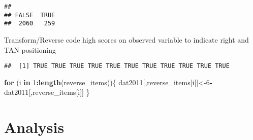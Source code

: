 \documentclass[
]{article}
\newenvironment{Shaded}{\begin{snugshade}}{\end{snugshade}}
\newcommand{\ControlFlowTok}[1]{\textcolor[rgb]{0.13,0.29,0.53}{\textbf{#1}}}
\newcommand{\DecValTok}[1]{\textcolor[rgb]{0.00,0.00,0.81}{#1}}
\newcommand{\KeywordTok}[1]{\textcolor[rgb]{0.13,0.29,0.53}{\textbf{#1}}}
\newcommand{\NormalTok}[1]{#1}
\newcommand{\OperatorTok}[1]{\textcolor[rgb]{0.81,0.36,0.00}{\textbf{#1}}}
\newcommand{\StringTok}[1]{\textcolor[rgb]{0.31,0.60,0.02}{#1}}
\begin{document}
\begin{verbatim}
## 
## FALSE  TRUE 
##  2060   259
\end{verbatim}

\begin{Shaded}
\end{Shaded}

Transform/Reverse code high scores on observed variable to indicate
right and TAN positioning

\begin{Shaded}
\end{Shaded}

\begin{verbatim}
##  [1] TRUE TRUE TRUE TRUE TRUE TRUE TRUE TRUE TRUE TRUE TRUE
\end{verbatim}

\begin{Shaded}
\begin{Highlighting}[]
\ControlFlowTok{for}\NormalTok{ (i }\ControlFlowTok{in} \DecValTok{1}\OperatorTok{:}\KeywordTok{length}\NormalTok{(reverse_items))\{}
\NormalTok{  dat2011[,reverse_items[i]]<-}\DecValTok{6}\OperatorTok{-}\NormalTok{dat2011[,reverse_items[i]]}
\NormalTok{\}}
\end{Highlighting}
\end{Shaded}

\newpage

\hypertarget{analysis}{%
\section{Analysis}\label{analysis}}
\end{document}
